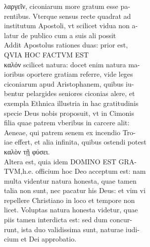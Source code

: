 \documentclass{article}
\begin{document}
\begin{pages}
                λαργεῖν, ciconiarum more gratum esse pa- \\
                rentibus. Vterque sensus recte quadrat ad \\
                institutum Apostoli, vt scilicet vidua non a- \\
                latur de publico cum a suis ali possit \\
                Addit Apostolus rationes duas: prior est, \\
                QVIA HOC FACTVM EST \\
                καλόν scilicet natura: docet enim natura ma- \\
                ioribus oportere gratiam referre, vide leges \\
                ciconiarum apud Aristophanem, quibus iu- \\
                bentur pelargides seniores ciconias alere, et \\
                exempla Ethnica illustria in hac gratitudinis \\
                specie Deus nobis proposuit, vt in Cimonis \\
                filia quae patrem vberibus in carcere alit: \\
                Aeneae, qui patrem senem ex incendio Tro- \\
                iae effert, et alia infinita, quibus ostendi potest \\
                καλὸν τῇ φύσει. \\
                Altera est, quia idem DOMINO EST GRA- \\
                TVM,h.e. officium hoc Deo acceptum est: nam \\
                multa videntur natura honesta, quae tamen \\
                talia non sunt, nec pacatur his Deus: et vim vi \\
                repellere Christiano in loco et tempore non \\
                licet. Voluptas natura honesta videtur, quae \\
                piis tamen interdicta est: sed dum concur- \\
                runt, ista duo validissima sunt, naturae iudi- \\
                cium et Dei approbatio. \\

\end{pages}
\end{document}
